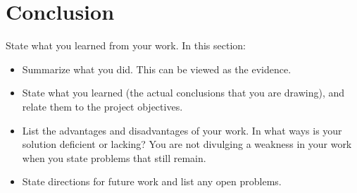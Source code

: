 \chapter{Conclusion}
State what you learned from your work. In this section:
\begin{itemize}
  \item Summarize what you did. This can be viewed as the evidence.
  \item State what you learned (the actual conclusions that you are drawing), and relate them to the project objectives.
  \item List the advantages and disadvantages of your work. In what ways is your solution deficient or lacking? You are not divulging a weakness in your work when you state problems that still remain.
  \item State directions for future work and list any open problems.
\end{itemize}
